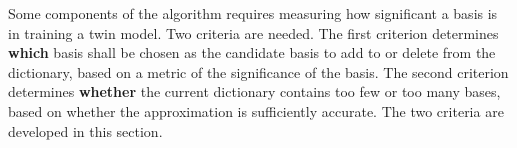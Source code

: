 Some components of the algorithm requires measuring how significant a basis is
in training a twin model. Two criteria are needed. 
The first criterion determines \textbf{which} basis shall be chosen as the candidate basis 
to add to or delete from the dictionary, based on a metric of the significance of 
the basis.
The second criterion determines \textbf{whether} the current dictionary contains too few or
too many bases, based
on whether the approximation is sufficiently accurate.
The two criteria are developed in this section. \\



